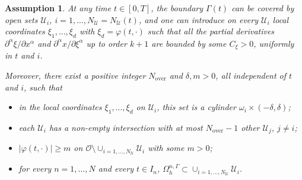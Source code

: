 \documentclass[10pt,a4paper]{amsart}
\newtheorem{assumption}{Assumption}
\begin{document}
\begin{assumption}\label{asm0}
	At any time $t\in[0,T]$, the boundary $\Gamma(t)$ can be covered by open sets $\mathcal{U}_i$, $i=1,\ldots,N_{\mathcal{U}}=N_{\mathcal{U}}(t)$, and one can introduce on every $\mathcal{U}_i$ local coordinates $\xi_1,\ldots,\xi_d$ with $\xi_d=\varphi(t,\cdot)$ such that all the partial derivatives $\partial^\alpha\xi/\partial x^\alpha$ and $\partial^\alpha x/\partial \xi^\alpha$ up to order $k+1$ are bounded by some $C_{\xi}>0$, uniformly in $t$ and $i$. 
	{Moreover, there exist a positive integer $N_\text{over}$ and $\delta,m>0$, all independent of $t$ and $i$, such that
	\begin{itemize}
		\item[(i)] in the local coordinates $\xi_1,\ldots,\xi_d$ on $\mathcal{U}_i$, this set is a cylinder $\omega_i\times(-\delta,\delta)$;  %
		\item[(ii)] %
		each $\mathcal{U}_i$ has a non-empty intersection with at most $N_\text{over}-1$ other $\mathcal{U}_j$, $j\not =i$;
		\item[(iii)] $|\varphi(t,\cdot)|\ge m$ on $\mathcal{O}\setminus\cup_{i=1,\ldots,N_{\mathcal{U}}}\mathcal{U}_i$ with some $m>0$;
		\item[(iv)] for every $n=1,\ldots,N$ and every $t\in I_n$,  $\Omega_h^{n,\Gamma}\subset\cup_{i=1,\ldots,N_{\mathcal{U}}}\mathcal{U}_i$.   
	\end{itemize}}
\end{assumption}
\end{document}
